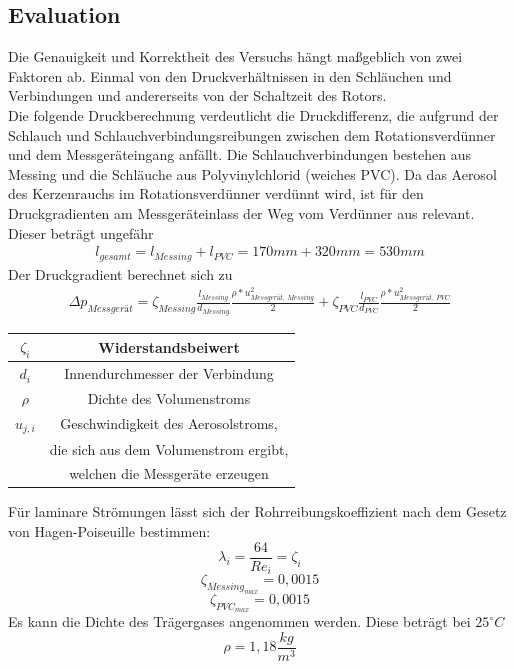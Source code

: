 \subsection{Evaluation}
Die Genauigkeit und Korrektheit des Versuchs h\"{a}ngt ma{\ss}geblich von zwei Faktoren ab. Einmal von den Druckverh\"{a}ltnissen in den Schl\"{a}uchen und Verbindungen und andererseits von der Schaltzeit des Rotors.\\
Die folgende Druckberechnung verdeutlicht die Druckdifferenz, die aufgrund der Schlauch und Schlauchverbindungsreibungen  zwischen dem
Rotationsverd\"{u}nner und dem Messger\"{a}teingang anf\"{a}llt. Die Schlauchverbindungen bestehen aus Messing und die Schl\"{a}uche aus Polyvinylchlorid (weiches PVC). Da das Aerosol des Kerzenrauchs im Rotationsverd\"{u}nner verd\"{u}nnt wird, ist f\"{u}r den Druckgradienten am Messger\"{a}teinlass der Weg vom Verd\"{u}nner aus relevant. Dieser betr\"{a}gt ungef\"{a}hr 
\begin{align*}
l_{gesamt} = l_{Messing} + l_{PVC} = 170mm + 320mm = 530mm
\end{align*}
Der Druckgradient berechnet sich zu
\begin{align*}
\Delta p_\textit{Messger\"{a}t} = \zeta_\textit{Messing} \frac{l_\textit{Messing}}{d_\textit{Messing}}\frac{\rho * u^{2}_\textit{Messger\"{a}t, Messing}}{2} + \zeta_\textit{PVC} \frac{l_\textit{PVC}}{d_\textit{PVC}} \frac{\rho * u^{2}_\textit{Messger\"{a}t, PVC}}{2}
\end{align*} 
\begin{center}
\begin{tabular}{c | c}
$\zeta_{i}$ & Widerstandsbeiwert\\
\hline
$d_{i}$ & Innendurchmesser der Verbindung\\
\hline
$\rho$ & Dichte des Volumenstroms\\
\hline
$u_{j,i}$ & Geschwindigkeit des Aerosolstroms,\\
& die sich aus dem Volumenstrom ergibt,\\
& welchen die Messger\"{a}te erzeugen
\end{tabular}
\end{center}
F\"{u}r laminare Str\"{o}mungen l\"{a}sst sich der Rohrreibungskoeffizient nach dem Gesetz von Hagen-Poiseuille bestimmen:
\[\lambda_{i} = \frac{64}{Re_{i}}=\zeta_{i}\]
\[\zeta_{Messing_\textit{max}} = 0,0015\]
\[\zeta_{PVC_\textit{max}} = 0,0015\]
Es kann die Dichte des Tr\"{a}gergases angenommen werden. Diese betr\"{a}gt bei $25^{\circ}C$ \[\rho = 1,18 \frac{kg}{m^{3}}\]\\
